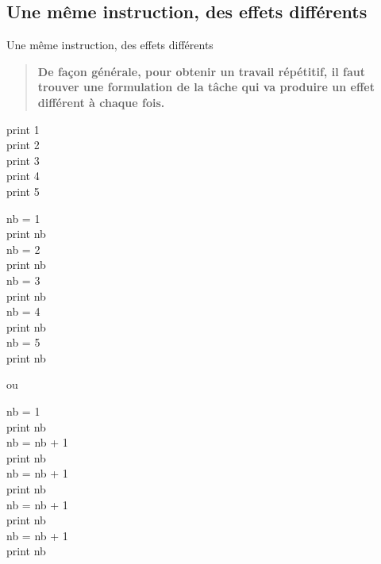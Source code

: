 \begin{hideedit}
\subsection{Une même instruction, des effets différents}
\begin{frame}{Une même instruction, des effets différents}
  \begin{quote}
    \bfseries
    De façon générale,
    pour obtenir un travail répétitif,
    il faut trouver une formulation de la tâche
    qui va produire un effet différent à chaque fois.
  \end{quote}

  \begin{wrong}
  \begin{langagenaturel}
    print 1\\
    print 2\\
    print 3\\
    print 4\\
    print 5
  \end{langagenaturel}
  \end{wrong}
\end{frame}

\begin{frame}
  \begin{minipage}{5cm}
    \begin{langagenaturel}
      nb = 1\\
      print nb\\
      nb = 2\\
      print nb\\
      nb = 3\\
      print nb\\
      nb = 4\\
      print nb\\
      nb = 5\\
      print nb\\
    \end{langagenaturel}
  \end{minipage}
  \pause
  \hfill ou \hfill
  \begin{minipage}{5cm}
    \begin{langagenaturel}
      nb = 1\\
      print nb\\
      nb = nb + 1\\
      print nb\\
      nb = nb + 1\\
      print nb\\
      nb = nb + 1\\
      print nb\\
      nb = nb + 1\\
      print nb\\
    \end{langagenaturel}
  \end{minipage}


\end{frame}
\end{hideedit}
